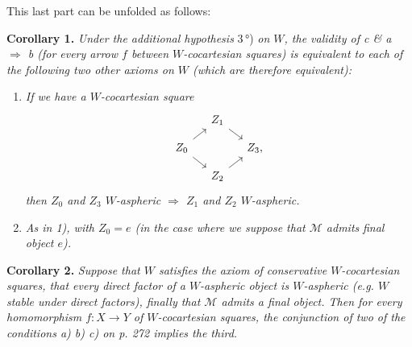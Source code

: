 This last part can be unfolded as follows:

\textbf{Corollary 1.} \textit{Under the additional hypothesis} \textup{3\,°)} \textit{on $W$, the validity of c \& a $\Longrightarrow$ b (for every arrow $f$ between $W$-cocartesian squares) is equivalent to each of the following two other axioms on $W$ (which are therefore equivalent):}

\begin{enumerate}
\item[\textit{1)}] \textit{If we have a $W$-cocartesian square}
\[
\begin{tikzcd}[ampersand replacement=\&, column sep=small, row sep=small]
 \& Z_1 \arrow[dr] \& \\
Z_0 \arrow[ur] \arrow[dr] \& \& Z_3, \\
 \& Z_2 \arrow[ur] \&
\end{tikzcd}
\]
\textit{then $Z_0$ and $Z_3$ $W$-aspheric $\Longrightarrow$ $Z_1$ and $Z_2$ $W$-aspheric.}
\item[\textit{1$'$)}] \textit{As in 1), with $Z_0 = e$ (in the case where we suppose that $\mathcal{M}$ admits} \textit{final object $e$).}
\end{enumerate}


\textbf{Corollary 2.} \textit{Suppose that $W$ satisfies the axiom of conservative $W$-cocartesian squares, that every direct factor of a $W$-aspheric object is $W$-aspheric (e.g. $W$ stable under direct factors), finally that $\mathcal{M}$ admits a final object. Then for every homomorphism $f : X \longrightarrow Y$ of $W$-cocartesian squares, the conjunction of two of the conditions a) b) c) on p. 272 implies the third.} %